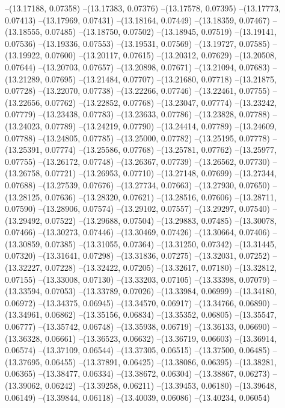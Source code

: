 --(13.17188, 0.07358)
--(13.17383, 0.07376)
--(13.17578, 0.07395)
--(13.17773, 0.07413)
--(13.17969, 0.07431)
--(13.18164, 0.07449)
--(13.18359, 0.07467)
--(13.18555, 0.07485)
--(13.18750, 0.07502)
--(13.18945, 0.07519)
--(13.19141, 0.07536)
--(13.19336, 0.07553)
--(13.19531, 0.07569)
--(13.19727, 0.07585)
--(13.19922, 0.07600)
--(13.20117, 0.07615)
--(13.20312, 0.07629)
--(13.20508, 0.07644)
--(13.20703, 0.07657)
--(13.20898, 0.07671)
--(13.21094, 0.07683)
--(13.21289, 0.07695)
--(13.21484, 0.07707)
--(13.21680, 0.07718)
--(13.21875, 0.07728)
--(13.22070, 0.07738)
--(13.22266, 0.07746)
--(13.22461, 0.07755)
--(13.22656, 0.07762)
--(13.22852, 0.07768)
--(13.23047, 0.07774)
--(13.23242, 0.07779)
--(13.23438, 0.07783)
--(13.23633, 0.07786)
--(13.23828, 0.07788)
--(13.24023, 0.07789)
--(13.24219, 0.07790)
--(13.24414, 0.07789)
--(13.24609, 0.07788)
--(13.24805, 0.07785)
--(13.25000, 0.07782)
--(13.25195, 0.07778)
--(13.25391, 0.07774)
--(13.25586, 0.07768)
--(13.25781, 0.07762)
--(13.25977, 0.07755)
--(13.26172, 0.07748)
--(13.26367, 0.07739)
--(13.26562, 0.07730)
--(13.26758, 0.07721)
--(13.26953, 0.07710)
--(13.27148, 0.07699)
--(13.27344, 0.07688)
--(13.27539, 0.07676)
--(13.27734, 0.07663)
--(13.27930, 0.07650)
--(13.28125, 0.07636)
--(13.28320, 0.07621)
--(13.28516, 0.07606)
--(13.28711, 0.07590)
--(13.28906, 0.07574)
--(13.29102, 0.07557)
--(13.29297, 0.07540)
--(13.29492, 0.07522)
--(13.29688, 0.07504)
--(13.29883, 0.07485)
--(13.30078, 0.07466)
--(13.30273, 0.07446)
--(13.30469, 0.07426)
--(13.30664, 0.07406)
--(13.30859, 0.07385)
--(13.31055, 0.07364)
--(13.31250, 0.07342)
--(13.31445, 0.07320)
--(13.31641, 0.07298)
--(13.31836, 0.07275)
--(13.32031, 0.07252)
--(13.32227, 0.07228)
--(13.32422, 0.07205)
--(13.32617, 0.07180)
--(13.32812, 0.07155)
--(13.33008, 0.07130)
--(13.33203, 0.07105)
--(13.33398, 0.07079)
--(13.33594, 0.07053)
--(13.33789, 0.07026)
--(13.33984, 0.06999)
--(13.34180, 0.06972)
--(13.34375, 0.06945)
--(13.34570, 0.06917)
--(13.34766, 0.06890)
--(13.34961, 0.06862)
--(13.35156, 0.06834)
--(13.35352, 0.06805)
--(13.35547, 0.06777)
--(13.35742, 0.06748)
--(13.35938, 0.06719)
--(13.36133, 0.06690)
--(13.36328, 0.06661)
--(13.36523, 0.06632)
--(13.36719, 0.06603)
--(13.36914, 0.06574)
--(13.37109, 0.06544)
--(13.37305, 0.06515)
--(13.37500, 0.06485)
--(13.37695, 0.06455)
--(13.37891, 0.06425)
--(13.38086, 0.06395)
--(13.38281, 0.06365)
--(13.38477, 0.06334)
--(13.38672, 0.06304)
--(13.38867, 0.06273)
--(13.39062, 0.06242)
--(13.39258, 0.06211)
--(13.39453, 0.06180)
--(13.39648, 0.06149)
--(13.39844, 0.06118)
--(13.40039, 0.06086)
--(13.40234, 0.06054)
